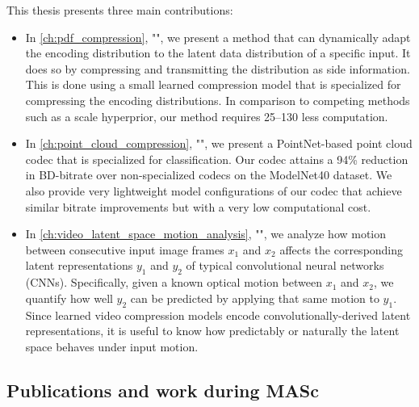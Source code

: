 This thesis presents three main contributions:
%
\begin{itemize}
  \item
    In \cref{ch:pdf_compression}, "",
    we present a method that can dynamically adapt the encoding distribution to the latent data distribution of a specific input.
    It does so by compressing and transmitting the distribution as side information.
    This is done using a small learned compression model that is specialized for compressing the encoding distributions.
    In comparison to competing methods such as a scale hyperprior, our method requires 25--130\texttimes{} less computation.
  \item
    In \cref{ch:point_cloud_compression}, "",
    we present a PointNet-based point cloud codec that is specialized for classification.
    Our codec attains a 94\% reduction in BD-bitrate over non-specialized codecs on the ModelNet40 dataset.
    We also provide very lightweight model configurations of our codec that achieve similar bitrate improvements but with a very low computational cost.
  \item
    In \cref{ch:video_latent_space_motion_analysis}, "",
    we analyze how motion between consecutive input image frames $x_1$ and $x_2$ affects the corresponding latent representations $y_1$ and $y_2$ of typical convolutional neural networks (CNNs).
    Specifically, given a known optical motion between $x_1$ and $x_2$, we quantify how well $y_2$ can be predicted by applying that same motion to $y_1$.
    Since learned video compression models encode convolutionally-derived latent representations, it is useful to know how predictably or naturally the latent space behaves under input motion.
\end{itemize}




\subsection*{Publications and work during MASc}


